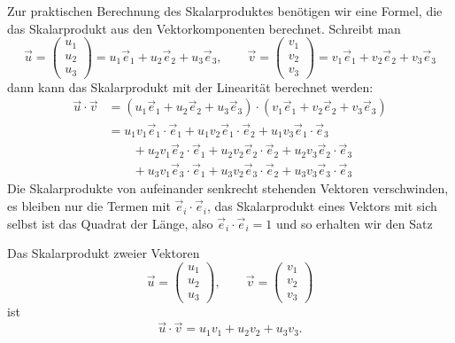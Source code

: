 Zur praktischen Berechnung des Skalarproduktes benötigen wir
eine Formel, die das Skalarprodukt aus den Vektorkomponenten
berechnet.
Schreibt man
\[
\vec u=\begin{pmatrix}u_1\\u_2\\u_3\end{pmatrix}
=u_1\vec e_1+u_2\vec e_2+u_3\vec e_3
,
\qquad
\vec v=\begin{pmatrix}v_1\\v_2\\v_3\end{pmatrix}
=v_1\vec e_1+v_2\vec e_2+v_3\vec e_3
\]
dann kann das Skalarprodukt mit der Linearität berechnet werden:
\begin{align*}
\vec u\cdot\vec v
&=
(u_1\vec e_1+u_2\vec e_2+u_3\vec e_3)\cdot
(v_1\vec e_1+v_2\vec e_2+v_3\vec e_3)
\\
&=
u_1v_1\vec e_1\cdot\vec e_1+
u_1v_2\vec e_1\cdot\vec e_2+
u_1v_3\vec e_1\cdot\vec e_3\\
&\qquad +
u_2v_1\vec e_2\cdot\vec e_1+
u_2v_2\vec e_2\cdot\vec e_2+
u_2v_3\vec e_2\cdot\vec e_3\\
&\qquad+
u_3v_1\vec e_3\cdot\vec e_1+
u_3v_2\vec e_3\cdot\vec e_2+
u_3v_3\vec e_3\cdot\vec e_3
\end{align*}
Die Skalarprodukte von aufeinander senkrecht stehenden Vektoren
verschwinden, es bleiben nur die Termen mit $\vec e_i\cdot\vec e_i$,
das Skalarprodukt eines Vektors mit sich selbst ist das Quadrat
der Länge, also $\vec e_i\cdot \vec e_i=1$ und so erhalten wir den
Satz
\begin{satz}
Das Skalarprodukt zweier Vektoren
\[
\vec u=\begin{pmatrix}u_1\\u_2\\u_3\end{pmatrix},
\qquad
\vec v=\begin{pmatrix}v_1\\v_2\\v_3\end{pmatrix}
\]
ist
\[
\vec u\cdot\vec v
=
u_1v_1+u_2v_2+u_3v_3.
\]
\end{satz}

